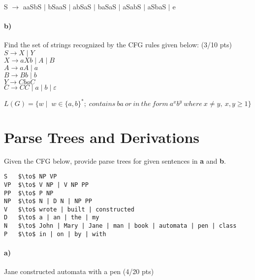 \documentclass[a4paper,12pt]{article}
\begin{document}
\begin{tcolorbox}
S $\rightarrow$ aaSbS $|$ bSaaS $|$ abSaS $|$  baSaS $|$ aSabS $|$ aSbaS $|$ e\\
\end{tcolorbox}



\paragraph{b)} Find the set of strings recognized by the CFG rules given below:         \hfill \small{(3/10 pts)} \\


$S \to X \mid Y$ \\
$X \to aXb \mid A \mid B$ \\
$A \to aA \mid a$ \\
$B \to Bb \mid b$ \\
$Y \to CbaC$ \\
$C \to CC \mid a \mid b \mid \varepsilon$  \\

\begin{tcolorbox}
$L(G)=\{w \mid \;  w \in \{a,b\}^*;\; contains \ ba \ or \ in \ the \ form \ a^xb^y \ where \ x \neq y,\ x,y\geq 1 \}$
\end{tcolorbox}


\newpage
\section{Parse Trees and Derivations \hfill {}}
Given the CFG below, provide parse trees for given sentences in \textbf{a} and \textbf{b}.\\

\begin{lstlisting}[style=output,mathescape=true]
S   $\to$ NP VP
VP  $\to$ V NP | V NP PP
PP  $\to$ P NP
NP  $\to$ N | D N | NP PP
V   $\to$ wrote | built | constructed
D   $\to$ a | an | the | my
N   $\to$ John | Mary | Jane | man | book | automata | pen | class
P   $\to$ in | on | by | with
\end{lstlisting}

\paragraph{a)} Jane constructed automata with a pen \hfill \small{(4/20 pts)} \\

\begin{tcolorbox}
\end{tcolorbox}
\newpage
\end{document}

